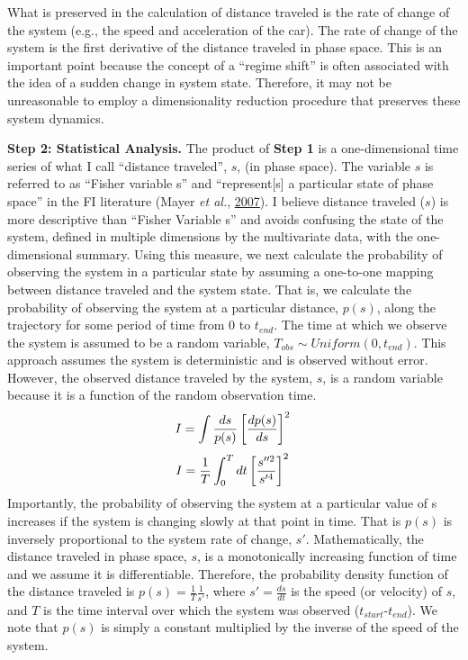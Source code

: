 \documentclass[print]{nuthesis}
\begin{document}
What is preserved in the calculation of distance traveled is the rate of change of the system (e.g., the speed and acceleration of the car). The rate of change of the system is the first derivative of the distance traveled in phase space. This is an important point because the concept of a ``regime shift'' is often associated with the idea of a sudden change in system state. Therefore, it may not be unreasonable to employ a dimensionality reduction procedure that preserves these system dynamics.

\textbf{Step 2: Statistical Analysis.} The product of \textbf{Step 1} is a one-dimensional time series of what I call ``distance traveled'', \(s\), (in phase space). The variable \(s\) is referred to as ``Fisher variable s'' and ``represent{[}s{]} a particular state of phase space'' in the FI literature (Mayer \emph{et al.}, \protect\hyperlink{ref-mayer_applications_2007}{2007}). I believe distance traveled (\(s\)) is more descriptive than ``Fisher Variable s'' and avoids confusing the state of the system, defined in multiple dimensions by the multivariate data, with the one-dimensional summary. Using this measure, we next calculate the probability of observing the system in a particular state by assuming a one-to-one mapping between distance traveled and the system state. That is, we calculate the probability of observing the system at a particular distance, \(p(s)\), along the trajectory for some period of time from 0 to \(t_{end}\). The time at which we observe the system is assumed to be a random variable, \(T_{obs} \sim Uniform(0,t_{end})\). This approach assumes the system is deterministic and is observed without error. However, the observed distance traveled by the system, \(s\), is a random variable because it is a function of the random observation time.
\begin{equation} 
    I = \int \frac{ds}{p(s)}\left[\frac{dp(s)}{ds}\right]^2  \\
    \label{eq:fiAdapted}
\end{equation}
\begin{equation}
    I=\frac{1}{T}\int_0^Tdt\left[\frac{s''^2}{s'^4}\right]^2 \\
  \label{eq:fiDerivs}
\end{equation}
Importantly, the probability of observing the system at a particular value of s increases if the system is changing slowly at that point in time. That is \(p(s)\) is inversely proportional to the system rate of change, \(s'\). Mathematically, the distance traveled in phase space, \(s\), is a monotonically increasing function of time and we assume it is differentiable. Therefore, the probability density function of the distance traveled is \(p(s)=\frac{1}{T}\frac{1}{s'}\), where \(s'=\frac{ds}{dt}\) is the speed (or velocity) of \(s\), and \(T\) is the time interval over which the system was observed (\(t_{start}\)-\(t_{end}\)). We note that \(p(s)\) is simply a constant multiplied by the inverse of the speed of the system.
\end{document}
